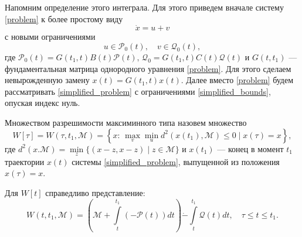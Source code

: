 Напомним определение этого интеграла. Для этого приведем вначале систему 
 \eqref{problem} к более простому виду
\begin{equation}\label{simplified_problem}
    \dot{x} = u + v
\end{equation}
 с новыми ограничениями
\begin{equation}\label{simplified_bounds}
    u \in \mathcal{P}_0(t), \quad v \in \mathcal{Q}_0(t),
\end{equation}
 где \( \mathcal{P}_0(t) = G(t_1, t) B(t) \mathcal{P}(t), \, \mathcal{Q}_0 = 
 G(t_1,t)C(t)\mathcal{Q}(t) \) и \( G(t,t_1) \) --- фундаментальная матрица
 однородного уравнения \eqref{problem}. Для этого сделаем невырожденную замену 
 \( x(t) = G(t_1, t)x(t) \). Далее вместо \eqref{problem} будем
 рассматривать \eqref{simplified_problem} с ограничениями \eqref{simplified_bounds}, 
 опуская индекс нуль.
\begin{definition}
    Множеством разрешимости максиминного типа назовем множество
    \begin{equation}\label{maxmin_solvability_set}
        W[\tau] = W(\tau, t_1, \mathcal{M}) = \left\{ x: \, \max_v \min_u
         d^2(x(t_1), \mathcal{M}) \le 0 \mid x(\tau) = x \right\}, 
    \end{equation}
     где \( d^2(x. \mathcal{M}) = \min\limits_z \{ (x-z,x-z) \mid z \in 
     \mathcal{M} \} \) и \( x(t_1) \) --- конец в момент \( t_1 \) траектории
     \( x(t) \) системы \eqref{simplified_problem}, выпущенной из положения 
     \( x(\tau) = x \).
\end{definition}
\begin{statement}
    Для \( W[t] \) справедливо представление:
    \begin{equation}
        W(t,t_1,\mathcal{M}) = \left( \mathcal{M} + \int\limits_t^{t_1} 
         (-\mathcal{P}(t)) dt \right) \dot{-} \int\limits_t^{t_1} \mathcal{Q}(t) dt,
         \quad \tau \le t \le t_1.
    \end{equation}
\end{statement}

